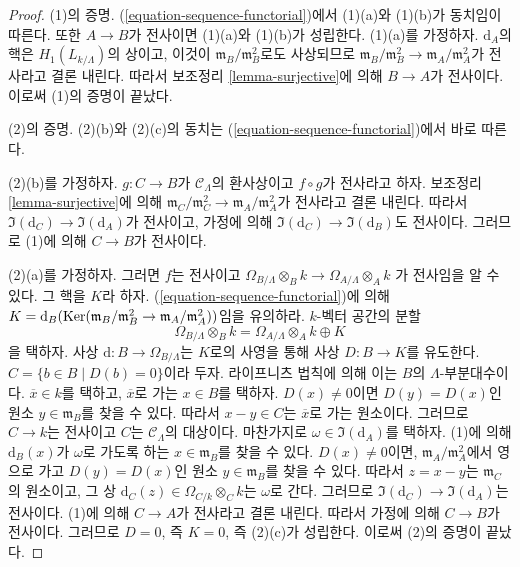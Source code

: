\begin{proof}
(1)의 증명. (\ref{equation-sequence-functorial})에서 (1)(a)와 (1)(b)가
동치임이 따른다. 또한
$A \to B$가 전사이면 (1)(a)와 (1)(b)가 성립한다. (1)(a)를 가정하자.
$\text{d}_A$의 핵은 $H_1(L_{k/\Lambda})$의 상이고, 이것이
$\mathfrak m_B/\mathfrak m_B^2$로도 사상되므로
$\mathfrak m_B/\mathfrak m_B^2 \to \mathfrak m_A/\mathfrak m_A^2$가
전사라고 결론 내린다. 따라서 보조정리 \ref{lemma-surjective}에 의해
$B \to A$가 전사이다. 이로써 (1)의 증명이 끝났다.

\medskip\noindent
(2)의 증명. (2)(b)와 (2)(c)의 동치는
(\ref{equation-sequence-functorial})에서 바로 따른다.

\medskip\noindent
(2)(b)를 가정하자. $g : C \to B$가 $\mathcal{C}_\Lambda$의 환사상이고
$f \circ g$가 전사라고 하자. 보조정리 \ref{lemma-surjective}에 의해
$\mathfrak m_C/\mathfrak m_C^2 \to \mathfrak m_A/\mathfrak m_A^2$가
전사라고 결론 내린다. 따라서
$\Im(\text{d}_C) \to \Im(\text{d}_A)$가 전사이고, 가정에 의해
$\Im(\text{d}_C) \to \Im(\text{d}_B)$도 전사이다.
그러므로 (1)에 의해 $C \to B$가 전사이다.

\medskip\noindent
(2)(a)를 가정하자. 그러면 $f$는 전사이고
$\Omega_{B/\Lambda} \otimes_B k \to \Omega_{A/\Lambda} \otimes_A k$
가 전사임을 알 수 있다. 그 핵을 $K$라 하자.
(\ref{equation-sequence-functorial})에 의해
$K = \text{d}_B(\mathop{\mathrm{Ker}}(\mathfrak m_B/\mathfrak m_B^2 \to
\mathfrak m_A/\mathfrak m_A^2))$임을 유의하라.
$k$-벡터 공간의 분할
$$
\Omega_{B/\Lambda} \otimes_B k =
\Omega_{A/\Lambda} \otimes_A k \oplus K
$$
을 택하자. 사상 $\text{d} : B \to \Omega_{B/\Lambda}$는 $K$로의 사영을
통해 사상 $D : B \to K$를 유도한다.
$C = \{b \in B \mid D(b) = 0\}$이라 두자. 라이프니츠 법칙에 의해 이는
$B$의 $\Lambda$-부분대수이다. $\overline{x} \in k$를 택하고,
$\overline{x}$로 가는 $x \in B$를 택하자. $D(x) \not = 0$이면
$D(y) = D(x)$인 원소 $y \in \mathfrak m_B$를 찾을 수 있다. 따라서
$x - y \in C$는 $\overline{x}$로 가는 원소이다. 그러므로 $C \to k$는
전사이고 $C$는 $\mathcal{C}_\Lambda$의 대상이다. 마찬가지로
$\omega \in \Im(\text{d}_A)$를 택하자. (1)에 의해
$\text{d}_B(x)$가 $\omega$로 가도록 하는 $x \in \mathfrak m_B$를 찾을 수
있다. $D(x) \not = 0$이면, $\mathfrak m_A/\mathfrak m_A^2$에서 영으로
가고 $D(y) = D(x)$인 원소 $y \in \mathfrak m_B$를 찾을 수 있다.
따라서 $z = x - y$는 $\mathfrak m_C$의 원소이고, 그 상
$\text{d}_C(z) \in \Omega_{C/k} \otimes_C k$는 $\omega$로 간다.
그러므로 $\Im(\text{d}_C) \to \Im(\text{d}_A)$는 전사이다.
(1)에 의해 $C \to A$가 전사라고 결론 내린다. 따라서 가정에 의해
$C \to B$가 전사이다. 그러므로 $D = 0$, 즉 $K = 0$, 즉 (2)(c)가 성립한다.
이로써 (2)의 증명이 끝났다.


\end{proof}
